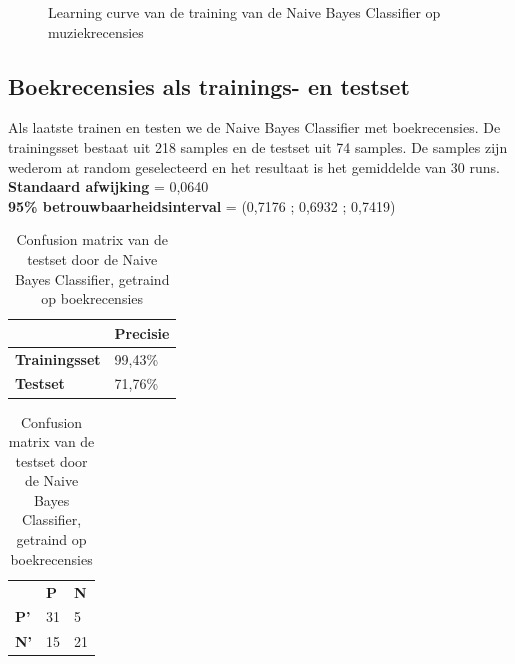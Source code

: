 \begin{figure}[h]%
    \centering
    \label{fig:lc-music-music}
    \caption{Learning curve van de training van de Naive Bayes Classifier op muziekrecensies}
\end{figure}

\subsection{Boekrecensies als trainings- en testset}\label{Boeken als trainings- en testset}

Als laatste trainen en testen we de Naive Bayes Classifier met boekrecensies. De trainingsset bestaat uit 218 samples en de testset uit 74 samples. De samples zijn wederom at random geselecteerd en het resultaat is het gemiddelde van 30 runs.\\

\textbf{Standaard afwijking} = 0,0640\\
\textbf{95\% betrouwbaarheidsinterval} = (0,7176 ; 0,6932 ; 0,7419)\\
 
\begin{table}[h]
\centering
\setlength\tabcolsep{4pt}
\begin{minipage}[t]{0.48\textwidth}
\centering
\begin{tabular}{l|l|}
\cline{2-2}
                                            & \textbf{Precisie} \\ \hline
\multicolumn{1}{|l|}{\textbf{Trainingsset}} & 99,43\%           \\ \hline
\multicolumn{1}{|l|}{\textbf{Testset}}      & 71,76\%           \\ \hline
\end{tabular}
\caption{Classificatieprecisie Naive Bayes Classifier, getraind op boekrecensies}
\end{minipage}%
\hfill
\begin{minipage}[t]{0.48\textwidth}
\centering
\begin{tabular}{lll}
                                 & \textbf{P}               & \textbf{N}            \\ \cline{2-3} 
\multicolumn{1}{l|}{\textbf{P'}} & \multicolumn{1}{l|}{31} & \multicolumn{1}{l|}{5} \\ \cline{2-3} 
\multicolumn{1}{l|}{\textbf{N'}} & \multicolumn{1}{l|}{15} & \multicolumn{1}{l|}{21} \\ \cline{2-3} 
\end{tabular}
\caption{Confusion matrix van de testset door de  Naive Bayes Classifier, getraind op boekrecensies} 
\end{minipage}
\end{table}


